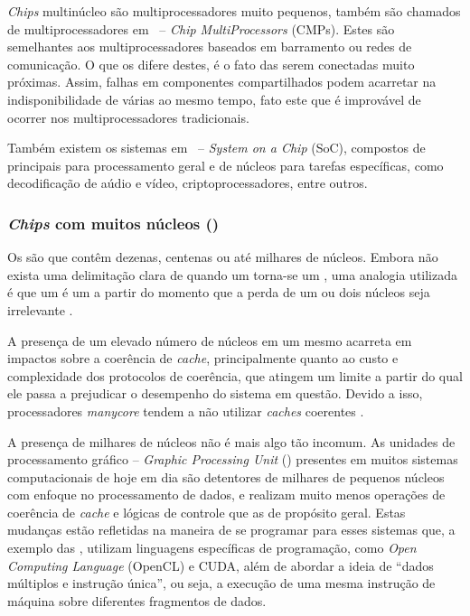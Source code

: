 \textit{Chips} multinúcleo são multiprocessadores muito pequenos, também são chamados de multiprocessadores em \chip~-- \textit{Chip MultiProcessors} (CMPs). Estes \chips são semelhantes aos multiprocessadores baseados em barramento ou redes de comunicação. O que os difere destes, é o fato das \cpus serem  conectadas muito próximas. Assim, falhas em componentes compartilhados podem acarretar na indisponibilidade de várias \cpus ao mesmo tempo, fato este que é improvável de ocorrer nos multiprocessadores tradicionais.

Também existem os sistemas em \chip~-- \textit{System on a Chip} (SoC), compostos de \cpus principais para processamento geral e de núcleos para tarefas específicas, como decodificação de aúdio e vídeo, criptoprocessadores, entre outros.

\subsubsection{\textit{Chips} com muitos núcleos (\manycore)}
\label{subsubsec:chips-manycore}

Os \manycore são \multicore que contêm dezenas, centenas ou até milhares de núcleos. Embora não exista uma delimitação clara de quando um \multicore torna-se um \manycore, uma analogia utilizada é que um \multicore é um \manycore a partir do momento que a perda de um ou dois núcleos seja irrelevante \cite{Tanenbaum:2014:MOS:2655363}.

A presença de um elevado número de núcleos em um mesmo \chip acarreta em impactos sobre a coerência de \textit{cache}, principalmente quanto ao custo e complexidade dos protocolos de coerência, que atingem um limite a partir do qual ele passa a prejudicar o desempenho do sistema em questão. Devido a isso, processadores \textit{manycore} tendem a não utilizar \textit{caches} coerentes \cite{Tanenbaum:2014:MOS:2655363}.

A presença de milhares de núcleos não é mais algo tão incomum. As unidades de processamento gráfico -- \textit{Graphic Processing Unit} (\gpu) presentes em muitos sistemas computacionais de hoje em dia são detentores de milhares de pequenos núcleos com enfoque no processamento de dados, e realizam muito menos operações de coerência de \textit{cache} e lógicas de controle que as \cpus de propósito geral. Estas mudanças estão refletidas na maneira de se programar para esses sistemas que, a exemplo das \gpus, utilizam linguagens específicas de programação, como \textit{Open Computing Language} (OpenCL) e CUDA, além de abordar a ideia de ``dados múltiplos e instrução única'', ou seja, a execução de uma mesma instrução de máquina sobre diferentes fragmentos de dados. 

